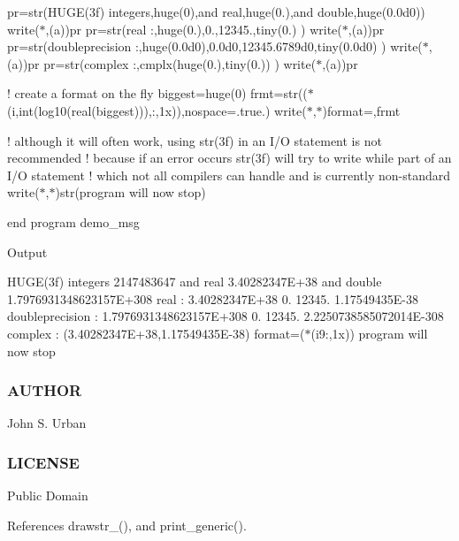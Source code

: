 pr=str(\textquotesingle{}H\+U\+G\+E(3f) integers\textquotesingle{},huge(0),\textquotesingle{}and real\textquotesingle{},huge(0.),\textquotesingle{}and double\textquotesingle{},huge(0.\+0d0)) write($\ast$,\textquotesingle{}(a)\textquotesingle{})pr pr=str(\textquotesingle{}real \+:\textquotesingle{},huge(0.),0.,12345.,tiny(0.) ) write($\ast$,\textquotesingle{}(a)\textquotesingle{})pr pr=str(\textquotesingle{}doubleprecision \+:\textquotesingle{},huge(0.\+0d0),0.\+0d0,12345.\+6789d0,tiny(0.\+0d0) ) write($\ast$,\textquotesingle{}(a)\textquotesingle{})pr pr=str(\textquotesingle{}complex \+:\textquotesingle{},cmplx(huge(0.),tiny(0.)) ) write($\ast$,\textquotesingle{}(a)\textquotesingle{})pr

! create a format on the fly biggest=huge(0) frmt=str(\textquotesingle{}($\ast$(i\textquotesingle{},int(log10(real(biggest))),\textquotesingle{}\+:,1x))\textquotesingle{},nospace=.true.) write($\ast$,$\ast$)\textquotesingle{}format=\textquotesingle{},frmt

! although it will often work, using str(3f) in an I/O statement is not recommended ! because if an error occurs str(3f) will try to write while part of an I/O statement ! which not all compilers can handle and is currently non-\/standard write($\ast$,$\ast$)str(\textquotesingle{}program will now stop\textquotesingle{})

end program demo\+\_\+msg

Output

H\+U\+G\+E(3f) integers 2147483647 and real 3.\+40282347E+38 and double 1.\+7976931348623157E+308 real \+: 3.\+40282347E+38 0. 12345. 1.\+17549435E-\/38 doubleprecision \+: 1.\+7976931348623157E+308 0. 12345. 2.\+2250738585072014E-\/308 complex \+: (3.\+40282347E+38,1.\+17549435E-\/38) format=($\ast$(i9\+:,1x)) program will now stop

\subsubsection*{A\+U\+T\+H\+OR}

John S. Urban

\subsubsection*{L\+I\+C\+E\+N\+SE}

Public Domain 

References drawstr\+\_\+(), and print\+\_\+generic().


